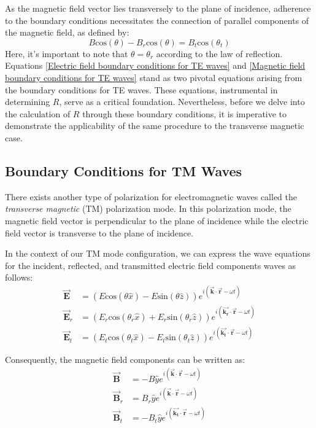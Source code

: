 As the magnetic field vector lies transversely to the plane of incidence, adherence to the boundary conditions necessitates the connection of parallel components of the magnetic field, as defined by:
\begin{equation} \label{Magnetic field boundary conditions for TE waves}
B\mathrm{cos}(\theta) - B_r\mathrm{cos}(\theta) = B_t\mathrm{cos}(\theta_t) 
\end{equation}
Here, it's important to note that $\theta = \theta_r$ according to the law of reflection. Equations \ref{Electric field boundary conditions for TE waves} and \ref{Magnetic field boundary conditions for TE waves} stand as two pivotal equations arising from the boundary conditions for TE waves. These equations, instrumental in determining $R$, serve as a critical foundation. Nevertheless, before we delve into the calculation of $R$ through these boundary conditions, it is imperative to demonstrate the applicability of the same procedure to the transverse magnetic case.

\subsection{Boundary Conditions for TM Waves}
There exists another type of polarization for electromagnetic waves called the \textit{transverse magnetic} (TM) polarization mode. In this polarization mode, the magnetic field vector is perpendicular to the plane of incidence while the electric field vector is transverse to the plane of incidence.

In the context of our TM mode configuration, we can express the wave equations for the incident, reflected, and transmitted electric field components waves as follows:
\begin{align*} 
\vec{\mathbf{E}} &= (E\mathrm{cos}(\theta \hat{x}) - E\mathrm{sin}(\theta \hat{z})) e^{i(\vec{\mathbf{k}} \cdot \vec{\mathbf{r}} - \omega t)} \\
\vec{\mathbf{E}}_r &= (E_r\mathrm{cos}(\theta_r \hat{x}) + E_r\mathrm{sin}(\theta_r \hat{z})) e^{i(\vec{\mathbf{k_r}} \cdot \vec{\mathbf{r}} - \omega t)} \\ 
\vec{\mathbf{E}}_t &= (E_t\mathrm{cos}(\theta_t \hat{x}) - E_t\mathrm{sin}(\theta_t \hat{z})) e^{i(\vec{\mathbf{k_t}} \cdot \vec{\mathbf{r}} - \omega t)}
\end{align*}

Consequently, the magnetic field components can be written as:
\begin{align*}
    \vec{\mathbf{B}} &= -B\hat{y} e^{i(\vec{\mathbf{k}} \cdot \vec{\mathbf{r}} - \omega t)} \\
    \vec{\mathbf{B}}_r &= B_r\hat{y} e^{i(\vec{\mathbf{k}} \cdot \vec{\mathbf{r}} - \omega t)} \\
    \vec{\mathbf{B}}_t &= -B_t\hat{y} e^{i(\vec{\mathbf{k_t}} \cdot \vec{\mathbf{r}} - \omega t)} \\
\end{align*}

